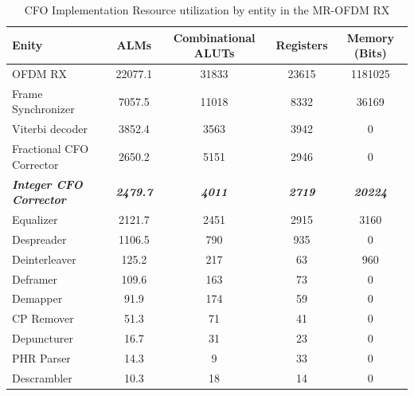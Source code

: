   
  
    
\begin{table}[htb]\small
\centering
\caption{CFO Implementation Resource utilization by entity in the MR-OFDM RX}
\label{table:results_fpga_cfo_by_entity_rx}
\begin{tabular}{lcccc} 
\hline
Enity				 &	ALMs    &	Combinational ALUTs & Registers & Memory (Bits)	\\	\hline 
OFDM RX				 & 	22077.1	& 	31833 & 	23615	& 	1181025		\\ 
Frame Synchronizer		 & 	7057.5	& 	11018 & 	8332	& 	36169		\\ 
Viterbi decoder			 & 	3852.4	& 	3563  & 	3942	& 	0		\\ 
Fractional CFO Corrector	 & 	2650.2	& 	5151  & 	2946	& 	0		\\ 
\emph{\textbf{Integer CFO Corrector}}		 &	\emph{\textbf{2479.7}}	& 	\emph{\textbf{4011}}  & 	\emph{\textbf{2719}}	& 	\emph{\textbf{20224}}		\\ 
Equalizer			 & 	2121.7	& 	2451  & 	2915	& 	3160		\\ 
Despreader			 & 	1106.5	& 	790   & 	935	& 	0		\\ 
Deinterleaver			 & 	125.2	& 	217   & 	63	& 	960		\\ 
Deframer			 & 	109.6	& 	163   & 	73	& 	0		\\ 
Demapper			 & 	91.9	& 	174   & 	59	& 	0		\\ 
CP Remover			 & 	51.3	& 	71    & 	41	& 	0		\\ 
Depuncturer			 & 	16.7	& 	31    & 	23	& 	0		\\ 
PHR Parser			 & 	14.3	& 	9     & 	33	& 	0		\\ 
Descrambler			 & 	10.3	& 	18    & 	14	& 	0		\\  \hline

\end{tabular}
\end{table}
  
